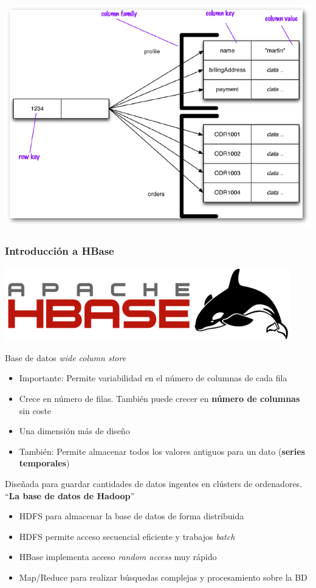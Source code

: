 \documentclass[14pt]{beamer}
\begin{document}
\begin{frame}
\begin{itemize}
\begin{frame}[plain]
\includegraphics[width=\textwidth]{img/column}
\end{frame}

\begin{frame}[allowframebreaks]
\frametitle{Introducción a HBase}
\begin{center}
  \includegraphics[width=.5\textwidth]{img/hbase_logo}
\end{center}
Base de datos {\em wide column store}
\begin{itemize}
\item Importante: Permite variabilidad en el número de columnas de cada
  fila
\item Crece en número de filas. También puede crecer en {\bf número de
    columnas} sin coste
\item Una dimensión más de diseño
\item También: Permite almacenar todos los valores antiguos para un dato
  ({\bf series temporales})
\end{itemize}

\framebreak

Diseñada para guardar cantidades de datos ingentes en clústers de
ordenadores. ``{\bf La base de datos de Hadoop}''
  \begin{itemize}
  \item HDFS para almacenar la base de datos de forma distribuida
  \item HDFS permite acceso secuencial eficiente y trabajos
    {\em batch\/}
  \item HBase implementa acceso {\em random access} muy rápido
  \item Map/Reduce para realizar búsquedas complejas y procesamiento sobre
    la BD
  \end{itemize}


\end{frame}
\end{itemize}
\end{frame}
\end{document}
